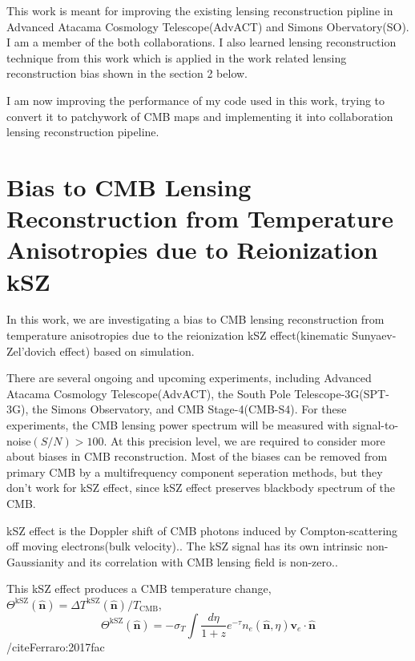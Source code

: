 \documentclass[12pt, notitlepage, onecolumn, amsmath, amssymb, aps]{revtex4-1}
\begin{document}
This work is meant for improving the existing lensing reconstruction pipline in Advanced Atacama Cosmology Telescope(AdvACT) and Simons Obervatory(SO). I am a member of the both collaborations. I also learned lensing reconstruction technique from this work which is applied in the work related lensing reconstruction bias shown in the section 2 below.

I am now improving the performance of my code used in this work, trying to convert it to patchywork of CMB maps and implementing it into collaboration lensing reconstruction pipeline.



\section{Bias to CMB Lensing Reconstruction from Temperature Anisotropies due to Reionization kSZ}
\label{sec:org093d799}
In this work, we are investigating a bias to CMB lensing reconstruction from temperature anisotropies due to the reionization kSZ effect(kinematic Sunyaev-Zel'dovich effect) based on simulation.

There are several ongoing and upcoming experiments, including Advanced Atacama Cosmology Telescope(AdvACT)\cite{Henderson:2015nzj}, the South Pole Telescope-3G(SPT-3G)\cite{Benson:2014qhw}, the Simons Observatory\cite{Ade:2018sbj}, and CMB Stage-4(CMB-S4)\cite{Abazajian:2016yjj}. For these experiments, the CMB lensing power spectrum will be measured with signal-to-noise\((S/N)>100\). At this precision level, we are required to consider more about biases in CMB reconstruction. Most of the biases can be removed from primary CMB by a multifrequency component seperation methods, but they don't work for kSZ effect, since kSZ effect preserves blackbody spectrum of the CMB.\cite{Smith:2009pn}

kSZ effect is the Doppler shift of CMB photons induced by Compton-scattering off moving electrons(bulk velocity).\cite{Ferraro:2017fac}. The kSZ signal has its own intrinsic non-Gaussianity and its correlation with CMB lensing field is non-zero.\cite{Smith:2016lnt}.

This kSZ effect produces a CMB temperature change, \(\Theta^{\mathrm{kSZ}}(\hat{\mathbf{n}})=\Delta T^{\mathrm{kSZ}}(\hat{\mathbf{n}}) / T_{\mathrm{CMB}}\),
\begin{equation}
  \Theta^{\mathrm{kSZ}}(\hat{\mathbf{n}})=-\sigma_{T} \int \frac{d \eta}{1+z} e^{-\tau} n_{e}(\hat{\mathbf{n}}, \eta) \mathbf{v}_{e} \cdot \hat{\mathbf{n}}
\end{equation}/cite{Ferraro:2017fac}
\end{document}
